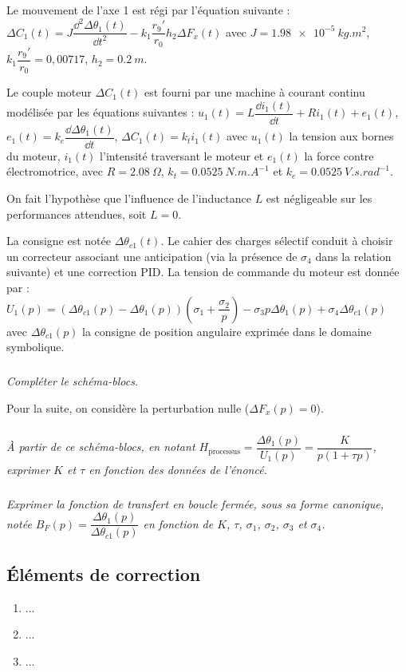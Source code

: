 \documentclass[10pt,fleqn]{article} %
\begin{document}
\begin{multicols}{2}
Le mouvement de l'axe 1 est régi par l'équation suivante : 
$\Delta C_1(t)=J\dfrac{\dd^2 \Delta \theta_1(t)}{\dd t^2} - k_1 \dfrac{r_9'}{r_0}h_2 \Delta F_x(t)$ avec $J=\SI{1,98e-5}{kg.m^2}$, $k_1\dfrac{r_9'}{r_0}=0,00717$, $h_2=\SI{0,2}{m}$.

Le couple moteur $\Delta C_1(t)$ est fourni par une machine à courant continu modélisée par les équations suivantes : 
$u_1(t)=L\dfrac{\dd i_1(t)}{\dd t}  + Ri_1(t)+e_1(t)$, $e_1(t)=k_e \dfrac{\dd \Delta \theta_1(t)}{\dd t}$, $\Delta C_1(t) = k_t i_1(t)$ avec $u_1(t)$ la tension aux bornes du moteur, $i_1(t)$ l’intensité traversant le moteur et $e_1(t)$ la force contre
électromotrice, avec $R=\SI{2,08}{\Omega}$, $k_t = \SI{0,0525}{N.m.A^{-1}}$ et $k_e = \SI{0,0525}{V.s.rad^{-1}}$.

On fait l’hypothèse que l’influence de l’inductance $L$ est négligeable sur les performances attendues, soit $L=0$.

La consigne est notée $\Delta \theta _{c1}(t)$. Le cahier des charges sélectif conduit à choisir un correcteur associant une anticipation (via la présence de $\sigma_4$ dans la relation suivante) et une correction PID. La tension de commande du moteur est donnée par : $U_1(p)=\left( \Delta \theta_{c1}(p)-\Delta \theta_1(p)\right) \left(\sigma_1 + \dfrac{\sigma_2}{p}\right)- \sigma_3p \Delta \theta_1(p)+\sigma_4\Delta \theta_{c1}(p)$
avec $\Delta \theta_{c1}(p)$ la consigne de position angulaire exprimée dans le domaine symbolique.

\subparagraph{}\textit{Compléter le schéma-blocs.}
\ifprof
\begin{corrige}
\end{corrige}
\else
\fi

Pour la suite, on considère la perturbation nulle ($\Delta F_x(p)=0$).



\subparagraph{}\textit{À partir de ce schéma-blocs, en notant $H_{\text{processus}}=\dfrac{\Delta \theta_1(p)}{U_1(p)}=\dfrac{K}{p\left(1+\tau p \right)}$, exprimer $K$ et $\tau$ en fonction des données de l'énoncé.}
\ifprof
\begin{corrige}
\end{corrige}
\else
\fi



\subparagraph{}\textit{Exprimer la fonction de transfert en boucle fermée, sous sa forme canonique, notée $B_F(p) = \dfrac{\Delta \theta_1(p)}{\Delta \theta_{c1}(p)}$ en fonction de $K$, $\tau$, $\sigma_1$, $\sigma_2$, $\sigma_3$ et  $\sigma_4$.}
\ifprof
\begin{corrige}
\end{corrige}
\else
\fi


\subsection*{Éléments de correction}
\begin{enumerate}
\item ...
\item ...
\item ...
\end{enumerate}
\end{multicols}
\end{document}
